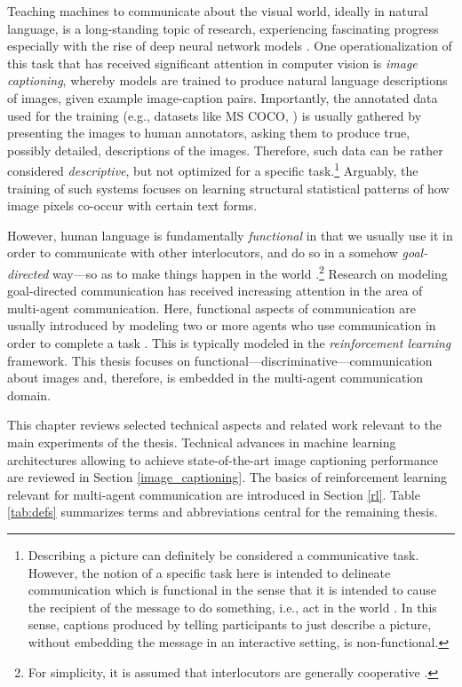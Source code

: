 Teaching machines to communicate about the visual world, ideally in natural language, is a long-standing topic of research, experiencing fascinating progress especially with the rise of deep neural network models \parencite{lecun2015deep, lake2017building}. 
One operationalization of this task that has received significant attention in computer vision is \textit{image captioning}, whereby models are trained to produce natural language descriptions of images, given example image-caption pairs. Importantly, the annotated data used for the training (e.g., datasets like MS COCO, \cite{chen2015microsoft}) is usually gathered by presenting the images to human annotators, asking them to produce true, possibly detailed, descriptions of the images. Therefore, such data can be rather considered \textit{descriptive}, but not optimized for a specific task.\footnote{Describing a picture can definitely be considered a communicative task. However, the notion of a specific task here is intended to delineate communication which is functional in the sense that it is intended to cause the recipient of the message to do something, i.e., act in the world \parencite{clark1996using, wittgenstein2010philosophical}. In this sense, captions produced by telling participants to just describe a picture, without embedding the message in an interactive setting, is non-functional.} Arguably, the training of such systems focuses on learning structural statistical patterns of how image pixels co-occur with certain text forms.

However, human language is fundamentally \textit{functional} in that we usually use it in order to communicate with other interlocutors, and do so in a somehow \textit{goal-directed} way---so as to make things happen in the world \parencite[e.g., ][]{wittgenstein2010philosophical, clark1996using}.\footnote{For simplicity, it is assumed that interlocutors are generally cooperative \parencite{grice1975logic}.} 
Research on modeling goal-directed communication has received increasing attention in the area of multi-agent communication. Here, functional aspects of communication are usually introduced by modeling two or more agents who use communication in order to complete a task \parencite{lazaridou2020multi}. This is typically modeled in the \textit{reinforcement learning} framework. This thesis focuses on functional---discriminative---communication about images and, therefore, is embedded in the multi-agent communication domain. 

This chapter reviews selected technical aspects and related work relevant to the main experiments of the thesis. Technical advances in machine learning architectures allowing to achieve state-of-the-art image captioning performance are reviewed in Section \ref{image_captioning}. The basics of reinforcement learning relevant for multi-agent communication are introduced in Section \ref{rl}. Table \ref{tab:defs} summarizes terms and abbreviations central for the remaining thesis. 

